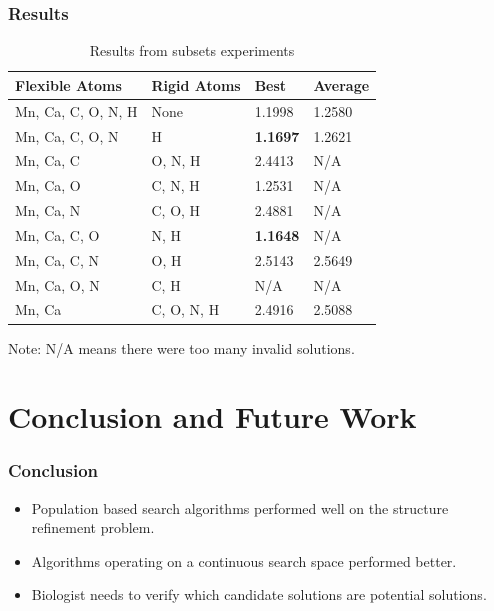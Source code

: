 \documentclass[10pt]{beamer}
\begin{document}
\begin{frame}
	\frametitle{Results}

	\begin{table}
		\caption{Results from subsets experiments}
		\begin{tabular}{ | l | l | l | l | }
			\hline
			Flexible Atoms & Rigid Atoms & Best & Average \\ \hline \hline
			Mn, Ca, C, O, N, H & None & 1.1998 & 1.2580 \\ \hline
			Mn, Ca, C, O, N & H & \textbf{1.1697} & 1.2621 \\ \hline
			Mn, Ca, C & O, N, H & 2.4413 & N/A \\ \hline
			Mn, Ca, O & C, N, H & 1.2531 & N/A \\ \hline
			Mn, Ca, N & C, O, H & 2.4881 & N/A \\ \hline
			Mn, Ca, C, O & N, H & \textbf{1.1648} & N/A \\ \hline
			Mn, Ca, C, N & O, H & 2.5143 & 2.5649 \\ \hline
			Mn, Ca, O, N & C, H & N/A & N/A \\ \hline
			Mn, Ca & C, O, N, H & 2.4916 & 2.5088 \\ \hline
		\end{tabular}
	\end{table}

	Note: N/A means there were too many invalid solutions.

\end{frame}

\section{Conclusion and Future Work}

\begin{frame}
	\frametitle{Conclusion}

	\begin{itemize}
		\item Population based search algorithms performed well on the structure refinement problem.
		\item Algorithms operating on a continuous search space performed better.
		\item Biologist needs to verify which candidate solutions are potential solutions.
	\end{itemize}

\end{frame}
\end{document}
